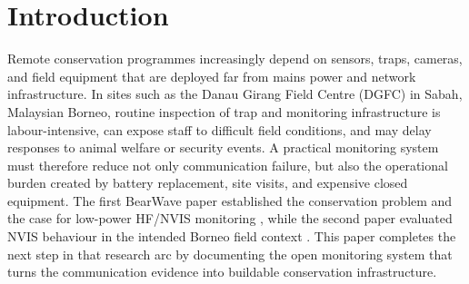 \documentclass[acmsmall,screen]{acmart}
\begin{document}



\maketitle

\section{Introduction}
Remote conservation programmes increasingly depend on sensors, traps, cameras, and field equipment that are deployed far from mains power and network infrastructure. In sites such as the Danau Girang Field Centre (DGFC) in Sabah, Malaysian Borneo, routine inspection of trap and monitoring infrastructure is labour-intensive, can expose staff to difficult field conditions, and may delay responses to animal welfare or security events. A practical monitoring system must therefore reduce not only communication failure, but also the operational burden created by battery replacement, site visits, and expensive closed equipment. The first BearWave paper established the conservation problem and the case for low-power HF/NVIS monitoring \cite{ButterworthMarkAndrew2025ERCi}, while the second paper evaluated NVIS behaviour in the intended Borneo field context \cite{Butterworth2026BorneoFieldTrial}. This paper completes the next step in that research arc by documenting the open monitoring system that turns the communication evidence into buildable conservation infrastructure.
\end{document}

